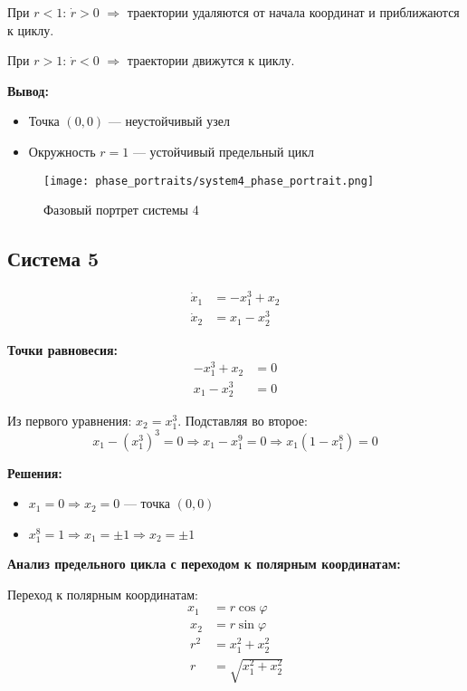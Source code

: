 При $r < 1$: $\dot{r} > 0$ $\Rightarrow$ траектории удаляются от начала координат и приближаются к циклу.

При $r > 1$: $\dot{r} < 0$ $\Rightarrow$ траектории движутся к циклу.

\textbf{Вывод:}
\begin{itemize}
\item Точка $(0,0)$ --- неустойчивый узел
\item Окружность $r = 1$ --- устойчивый предельный цикл
\end{itemize}

\begin{figure}[H]
\centering
\texttt{[image: phase\_portraits/system4\_phase\_portrait.png]}
\caption{Фазовый портрет системы 4}
\label{fig:system4_phase_portrait}
\end{figure}

\subsection*{Система 5}

\begin{align}
\dot{x}_1 &= -x_1^3 + x_2 \\
\dot{x}_2 &= x_1 - x_2^3
\end{align}

\textbf{Точки равновесия:}
\begin{align}
-x_1^3 + x_2 &= 0 \\
x_1 - x_2^3 &= 0
\end{align}

Из первого уравнения: $x_2 = x_1^3$. Подставляя во второе:
$$x_1 - (x_1^3)^3 = 0 \Rightarrow x_1 - x_1^9 = 0 \Rightarrow x_1(1 - x_1^8) = 0$$

\textbf{Решения:}
\begin{itemize}
\item $x_1 = 0 \Rightarrow x_2 = 0$ --- точка $(0, 0)$
\item $x_1^8 = 1 \Rightarrow x_1 = \pm 1 \Rightarrow x_2 = \pm 1$
\end{itemize}

\textbf{Анализ предельного цикла с переходом к полярным координатам:}

Переход к полярным координатам:
\begin{align}
x_1 &= r\cos\varphi \\\
x_2 &= r\sin\varphi \\\
r^2 &= x_1^2 + x_2^2 \\\
r &= \sqrt{x_1^2 + x_2^2}
\end{align}

